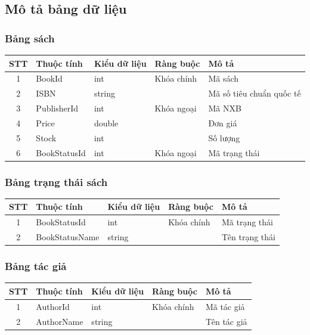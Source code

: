 \documentclass[12pt]{report}
\begin{document}
        \subsection{Mô tả bảng dữ liệu}
            \subsubsection{Bảng sách}
                \begin{tabular}{|c|l|l|l|l|}
                    \hline
                    \textbf{STT} & \textbf{Thuộc tính} & \textbf{Kiểu dữ liệu} & \textbf{Ràng buộc} & \textbf{Mô tả} \\ \hline
                    1 & BookId & int & Khóa chính & Mã sách \\ \hline
                    2 & ISBN & string & & Mã số tiêu chuẩn quốc tế \\ \hline
                    3 & PublisherId & int & Khóa ngoại & Mã NXB \\ \hline
                    4 & Price & double & & Đơn giá \\ \hline
                    5 & Stock & int & & Số lượng \\ \hline
                    6 & BookStatusId & int & Khóa ngoại & Mã trạng thái \\ \hline
                \end{tabular}
            \subsubsection{Bảng trạng thái sách}
                \begin{tabular}{|c|l|l|l|l|}
                    \hline
                    \textbf{STT} & \textbf{Thuộc tính} & \textbf{Kiểu dữ liệu} & \textbf{Ràng buộc} & \textbf{Mô tả} \\ \hline
                    1 & BookStatusId & int & Khóa chính & Mã trạng thái \\ \hline
                    2 & BookStatusName & string & & Tên trạng thái \\ \hline
                \end{tabular}
            \subsubsection{Bảng tác giả}
                \begin{tabular}{|c|l|l|l|l|}
                    \hline
                    \textbf{STT} & \textbf{Thuộc tính} & \textbf{Kiểu dữ liệu} & \textbf{Ràng buộc} & \textbf{Mô tả} \\ \hline
                    1 & AuthorId & int & Khóa chính & Mã tác giả \\ \hline
                    2 & AuthorName & string & & Tên tác giả \\ \hline
                \end{tabular}
\end{document}
